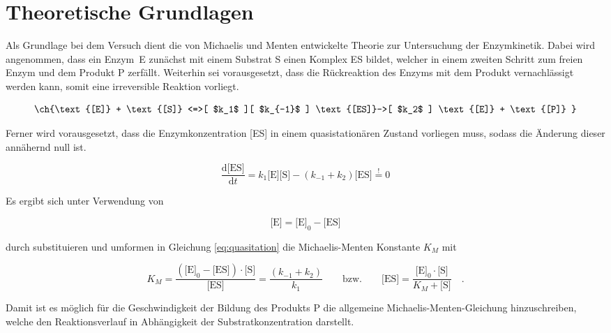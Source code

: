 \setlength\abovedisplayshortskip{20pt}
\setlength\belowdisplayshortskip{20pt}
\setlength\abovedisplayskip{20pt}
\setlength\belowdisplayskip{20pt}

\section{Theoretische Grundlagen}

Als Grundlage bei dem Versuch dient die von Michaelis und Menten\cite{mmquelle} entwickelte Theorie zur Untersuchung der Enzymkinetik. Dabei wird angenommen, dass ein Enzym~E zunächst mit einem Substrat S einen Komplex ES bildet, welcher in einem zweiten Schritt zum freien Enzym und dem Produkt P zerfällt. Weiterhin sei vorausgesetzt, dass die Rückreaktion des Enzyms mit dem Produkt vernachlässigt werden kann, somit eine irreversible Reaktion vorliegt. 

\begin{equation}
\ch{\text{[E]} + \text{[S]} <=>[ $k_1$ ][ $k_{-1}$ ] \text{[ES]}->[ $k_2$ ] \text{[E]} + \text{[P]} }
\end{equation}


Ferner wird vorausgesetzt, dass die Enzymkonzentration [ES] in einem quasistationären Zustand vorliegen muss, sodass die Änderung dieser annähernd null ist.

\begin{equation}
\frac{\text{d[ES]}}{\text{d}t} = k_1\text{[E][S]}-\left(k_{-1} + k_2\right)\text{[ES]} \stackrel{!}{=} 0
\label{eq:quasitation}
\end{equation}

Es ergibt sich unter Verwendung von

\begin{equation}
\text{[E]} = \text{[E]}_0-\text{[ES]}
\end{equation}

durch substituieren und umformen in Gleichung \ref{eq:quasitation}  die Michaelis-Menten Konstante $K_M$ mit

\begin{equation}
K_M=\frac{\left(\text{[E]}_0-\text{[ES]}\right)\cdot \text{[S]}}{\text{[ES]}}=\frac{\left(k_{-1} + k_2\right)}{k_1}\quad\quad\text{bzw.}\quad\quad 
\text{[ES]}=\frac{\text{[E]}_0\cdot \text{[S]}}{K_M+\text{[S]}} \quad\text{.}
\label{eq:MMkonstante}
\end{equation}

Damit ist es möglich für die Geschwindigkeit der Bildung des Produkts P die allgemeine Michaelis-Menten-Gleichung hinzuschreiben, welche den Reaktionsverlauf in Abhängigkeit der Substratkonzentration darstellt.

